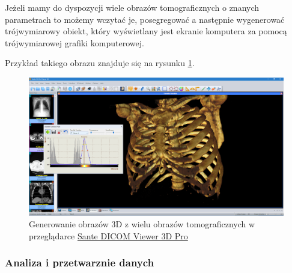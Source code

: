 Jeżeli mamy do dyspozycji wiele obrazów tomograficznych o znanych parametrach to możemy wczytać je, posegregować a następnie wygenerować trójwymiarowy obiekt, który wyświetlany jest ekranie komputera za pomocą trójwymiarowej grafiki komputerowej.

Przykład takiego obrazu znajduje się na rysunku \ref{fig:dicomviewer002}.

\begin{figure}[!htbp]
    \centering
    \includegraphics[width=\textwidth]{img/dicom-viewer-002.png}
    \caption{Generowanie obrazów 3D z wielu obrazów tomograficznych w przeglądarce \href{https://www.santesoft.com/win/sante-dicom-viewer-3d-pro/sante-dicom-viewer-3d-pro.html}{Sante DICOM Viewer 3D Pro}}
    \label{fig:dicomviewer002}
\end{figure}

\subsubsection{Analiza i przetwarznie danych}

